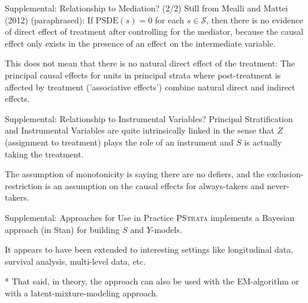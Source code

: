 \documentclass[10pt]{beamer}
\begin{document}
\begin{frame}{Supplemental: Relationship to Mediation? \hfill {\small (2/2)}}
Still from Mealli and Mattei (2012) (paraphrased): \newline \newline 
If $\mathrm{PSDE}(s) = 0$ for each $s \in \mathcal S$, then there is no evidence 
of direct effect of treatment after controlling for the mediator, because 
the causal effect only exists in the presence of an effect on the intermediate 
variable. 

This does not mean that there is no natural direct effect of the treatment: The principal causal 
effects for units in principal strata where post-treatment is affected by treatment 
('associative effects') combine natural direct and indirect effects. 
\end{frame}

\begin{frame}{Supplemental: Relationship to Instrumental Variables?}
Principal Stratification and Instrumental Variables are quite intrinsically linked in the 
sense that $Z$ (assignment to treatment) plays the role of an instrument and 
$S$ is actually taking the treatment. 

The assumption of monotonicity is saying there are no defiers, and the
exclusion-restriction is an assumption on the causal effects for 
always-takers and never-takers. 
\end{frame}

\begin{frame}{Supplemental: Approaches for Use in Practice}
\textsc{PStrata} implements a Bayesian approach (in Stan) for building $S$ and $Y$-models.

It appears to have been extended to interesting settings like longitudinal data, survival
analysis, multi-level data, etc.

{\footnotesize 
* That said, in theory, the approach can also be used with the EM-algorithm or
with a latent-mixture-modeling approach.
}
\end{frame}
\end{document}

